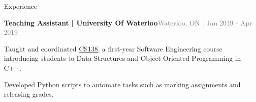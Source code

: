 \documentclass[hidelinks]{resume} %
\begin{document}
\begin{rSection}{Experience}
\begin{rSubsection}{\textbf{Teaching Assistant | University Of Waterloo}}{\textcolor{gray}{\small Waterloo, ON | Jan 2019 - Apr 2019}}{}
    \begin{bulletpoints}
        \vspace{-.10cm}
        \item Taught and coordinated \href{https://student.cs.uwaterloo.ca/~cs138/outline.shtml}{ \underline{CS138}}, a first-year Software Engineering course introducing students to Data Structures and Object Oriented Programming in C++.
        \vspace{-.13cm}
        \item Developed Python scripts to automate tasks such as marking assignments and releasing grades.
        \vspace{-.10cm}
    \end{bulletpoints}   

\end{rSubsection}

\end{rSection}

\vspace{-.05cm}
\end{document}

